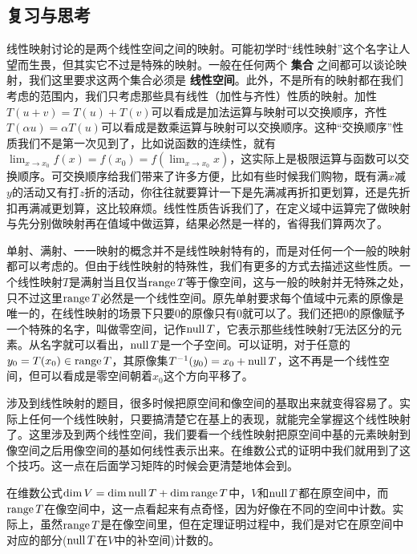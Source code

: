 \documentclass[hyperref,]{ctexart}
\begin{document}
\subsection{复习与思考}\label{ux590dux4e60ux4e0eux601dux8003-3}

线性映射讨论的是两个线性空间之间的映射。可能初学时``线性映射''这个名字让人望而生畏，但其实它不过是特殊的映射。一般在任何两个
\textbf{集合} 之间都可以谈论映射，我们这里要求这两个集合必须是
\textbf{线性空间}。此外，不是所有的映射都在我们考虑的范围内，我们只考虑那些具有线性（加性与齐性）性质的映射。加性\(T(u+v)=T(u)+T(v)\)可以看成是加法运算与映射可以交换顺序，齐性\(T(\alpha u)=\alpha T(u)\)可以看成是数乘运算与映射可以交换顺序。这种``交换顺序''性质我们不是第一次见到了，比如说函数的连续性，就有\(\lim_{x\rightarrow x_0} f(x)=f(x_0)=f(\lim_{x\rightarrow x_0}x)\)，这实际上是极限运算与函数可以交换顺序。可交换顺序给我们带来了许多方便，比如有些时候我们购物，既有满\(x\)减\(y\)的活动又有打\(z\)折的活动，你往往就要算计一下是先满减再折扣更划算，还是先折扣再满减更划算，这比较麻烦。线性性质告诉我们了，在定义域中运算完了做映射与先分别做映射再在值域中做运算，结果必然是一样的，省得我们算两次了。

单射、满射、一一映射的概念并不是线性映射特有的，而是对任何一个一般的映射都可以考虑的。但由于线性映射的特殊性，我们有更多的方式去描述这些性质。一个线性映射\(T\)是满射当且仅当\(\mathrm{range}\, T\)等于像空间，这与一般的映射并无特殊之处，只不过这里\(\mathrm{range}\, T\)必然是一个线性空间。原先单射要求每个值域中元素的原像是唯一的，在线性映射的场景下只要\(0\)的原像只有\(0\)就可以了。我们还把\(0\)的原像赋予一个特殊的名字，叫做零空间，记作\(\mathrm{null}\, T\)，它表示那些线性映射\(T\)无法区分的元素。从名字就可以看出，\(\mathrm{null}\, T\)是一个子空间。可以证明，对于任意的\(y_0=T(x_0)\in \mathrm{range}\, T\)，其原像集\(T^{-1}(y_0)=x_0+\mathrm{null}\, T\)，这不再是一个线性空间，但可以看成是零空间朝着\(x_0\)这个方向平移了。

涉及到线性映射的题目，很多时候把原空间和像空间的基取出来就变得容易了。实际上任何一个线性映射，只要搞清楚它在基上的表现，就能完全掌握这个线性映射了。这里涉及到两个线性空间，我们要看一个线性映射把原空间中基的元素映射到像空间之后用像空间的基如何线性表示出来。在维数公式的证明中我们就用到了这个技巧。这一点在后面学习矩阵的时候会更清楚地体会到。

在维数公式\(\mathrm{dim}\, V = \mathrm{dim}\,\mathrm{null}\, T+\mathrm{dim}\, \mathrm{range}\, T\)中，\(V\)和\(\mathrm{null}\, T\)都在原空间中，而\(\mathrm{range}\, T\)在像空间中，这一点看起来有点奇怪，因为好像在不同的空间中计数。实际上，虽然\(\mathrm{range}\, T\)是在像空间里，但在定理证明过程中，我们是对它在原空间中对应的部分(\(\mathrm{null}\, T\)在\(V\)中的补空间)计数的。
\end{document}
